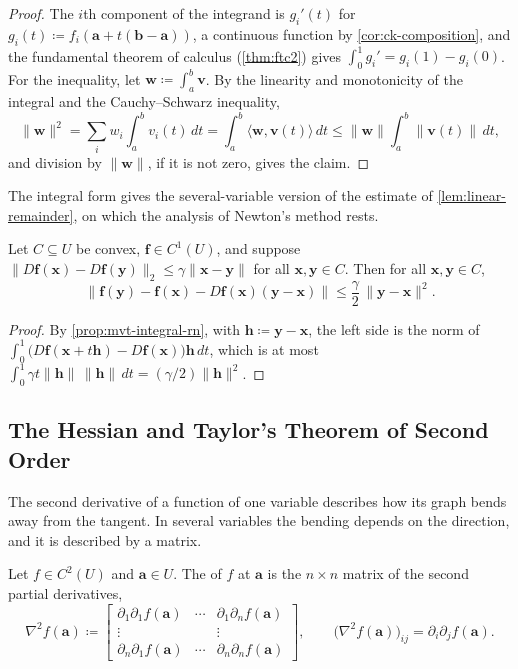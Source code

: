 \begin{proof}
The $i$th component of the integrand is $g_i'(t)$ for $g_i(t)\coloneqq f_i(\mathbf a+t(\mathbf b-\mathbf a))$, a continuous function by \cref{cor:ck-composition}, and the fundamental theorem of calculus (\cref{thm:ftc2}) gives $\int_0^1g_i'=g_i(1)-g_i(0)$. For the inequality, let $\mathbf w\coloneqq\int_a^b\mathbf v$. By the linearity and monotonicity of the integral and the Cauchy--Schwarz inequality,
\[
\|\mathbf w\|^2=\sum_iw_i\int_a^bv_i(t)\,dt=\int_a^b\langle\mathbf w,\mathbf v(t)\rangle\,dt\le\|\mathbf w\|\int_a^b\|\mathbf v(t)\|\,dt ,
\]
and division by $\|\mathbf w\|$, if it is not zero, gives the claim.
\end{proof}

The integral form gives the several-variable version of the estimate of \cref{lem:linear-remainder}, on which the analysis of Newton's method rests.

\begin{lemma}
\label{lem:linear-remainder-rn}
Let $C\subseteq U$ be convex, $\mathbf f\in C^1(U)$, and suppose $\|D\mathbf f(\mathbf x)-D\mathbf f(\mathbf y)\|_2\le\gamma\|\mathbf x-\mathbf y\|$ for all $\mathbf x,\mathbf y\in C$. Then for all $\mathbf x,\mathbf y\in C$,
\[
\bigl\|\mathbf f(\mathbf y)-\mathbf f(\mathbf x)-D\mathbf f(\mathbf x)(\mathbf y-\mathbf x)\bigr\|\le\frac\gamma2\,\|\mathbf y-\mathbf x\|^2 .
\]
\end{lemma}

\begin{proof}
By \cref{prop:mvt-integral-rn}, with $\mathbf h\coloneqq\mathbf y-\mathbf x$, the left side is the norm of $\int_0^1\bigl(D\mathbf f(\mathbf x+t\mathbf h)-D\mathbf f(\mathbf x)\bigr)\mathbf h\,dt$, which is at most $\int_0^1\gamma t\|\mathbf h\|\,\|\mathbf h\|\,dt=(\gamma/2)\|\mathbf h\|^2$.
\end{proof}

\subsection{The Hessian and Taylor's Theorem of Second Order}

The second derivative of a function of one variable describes how its graph bends away from the tangent. In several variables the bending depends on the direction, and it is described by a matrix.

\begin{definition}
\label{def:hessian}
Let $f\in C^2(U)$ and $\mathbf a\in U$. The  of $f$ at $\mathbf a$ is the $n\times n$ matrix of the second partial derivatives,
\[
\nabla^2f(\mathbf a)\coloneqq\begin{bmatrix}\partial_1\partial_1f(\mathbf a)&\cdots&\partial_1\partial_nf(\mathbf a)\\\vdots&&\vdots\\\partial_n\partial_1f(\mathbf a)&\cdots&\partial_n\partial_nf(\mathbf a)\end{bmatrix},\qquad\bigl(\nabla^2f(\mathbf a)\bigr)_{ij}=\partial_i\partial_jf(\mathbf a).
\]
\end{definition}

